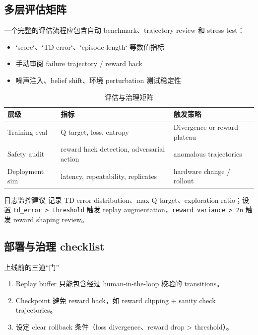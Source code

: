 \documentclass[a4paper]{article}
\begin{document}
\subsection{多层评估矩阵}

一个完整的评估流程应包含自动 benchmark、trajectory review 和 stress test：

\begin{itemize}
    \item `score`、`TD error`、`episode length` 等数值指标
    \item 手动审阅 failure trajectory / reward hack
    \item 噪声注入、belief shift、环境 perturbation 测试稳定性
\end{itemize}

\begin{table}[H]
\centering
\begin{tabular}{p{} p{} p{}}
\toprule
层级 & 指标 & 触发策略 \\
\midrule
Training eval & Q target, loss, entropy & Divergence or reward plateau \\
Safety audit & reward hack detection, adversarial action & anomalous trajectories \\
Deployment sim & latency, repeatability, replicates & hardware change / rollout \\
\bottomrule
\end{tabular}
\caption{评估与治理矩阵}
\end{table}

\begin{knowledgebox}{日志监控建议}
记录 TD error distribution、max Q target、exploration ratio；设置 \texttt{td\_error > threshold} 触发 replay augmentation，\texttt{reward variance > 2σ} 触发 reward shaping review。
\end{knowledgebox}

\subsection{部署与治理 checklist}

\begin{warningbox}{上线前的三道“门”}
\begin{enumerate}
    \item Replay buffer 只能包含经过 human-in-the-loop 校验的 transitions。
    \item Checkpoint 避免 reward hack，如 reward clipping + sanity check trajectories。
    \item 设定 clear rollback 条件（loss divergence、reward drop > threshold）。
\end{enumerate}
\end{warningbox}
\end{document}
